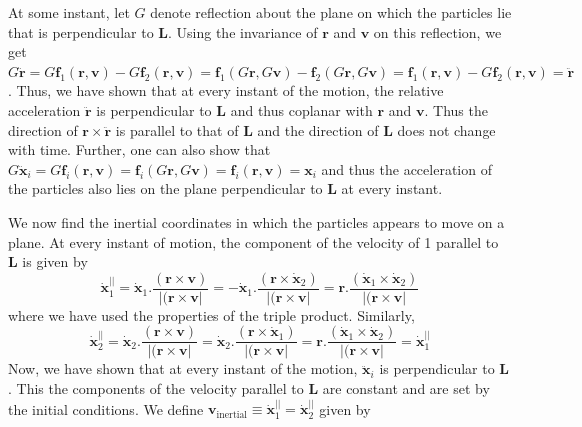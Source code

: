 \begin{enumerate}
At some instant, let $ G $ denote reflection about the plane on which the particles lie that is perpendicular to $\mathbf{L}$. Using the invariance of $\mathbf{r}$ and $\mathbf{v}$ on this reflection, we get $G \ddot{\mathbf{r}} = G\mathbf{f}_1(\mathbf{r},\mathbf{v})-G\mathbf{f}_2(\mathbf{r},\mathbf{v}) =\mathbf{f}_1(G\mathbf{r},G\mathbf{v})-\mathbf{f}_2(G\mathbf{r},G\mathbf{v}) = \mathbf{f}_1(\mathbf{r},\mathbf{v})-G\mathbf{f}_2(\mathbf{r},\mathbf{v}) = \ddot{\mathbf{r}} $. Thus, we have shown that at every instant of the motion, the relative acceleration $\ddot{\mathbf{r}}$ is perpendicular to $\mathbf{L}$ and thus coplanar with $\mathbf{r}$ and $\mathbf{v}$. Thus the direction of $\mathbf{r}\times\ddot{\mathbf{r}}$ is parallel to that of $\mathbf{L}$ and the direction of $\mathbf{L}$ does not change with time. Further, one can also show that $G \ddot{\mathbf{x}}_i =G\mathbf{f}_i(\mathbf{r},\mathbf{v}) = \mathbf{f}_i(G\mathbf{r},G\mathbf{v}) = \mathbf{f}_i(\mathbf{r},\mathbf{v}) = \mathbf{x}_i$ and thus the acceleration of the particles also lies on the plane perpendicular to $\mathbf{L}$ at every instant.\par
We now find the inertial coordinates in which the particles appears to move on a plane. At every instant of motion, the component of the velocity of 1 parallel to $\mathbf{L}$ is given by 
\begin{equation}\label{key}
	\dot{\mathbf{x}}_1^{||} = \dot{\mathbf{x}}_1.\frac{(\mathbf{r}\times\mathbf{v})}{|(\mathbf{r}\times\mathbf{v}|} = -\dot{\mathbf{x}}_1.\frac{(\mathbf{r}\times\dot{\mathbf{x}}_2)}{|(\mathbf{r}\times\mathbf{v}|} = \mathbf{r}.\frac{(\dot{\mathbf{x}}_1\times\dot{\mathbf{x}}_2)}{|(\mathbf{r}\times\mathbf{v}|}
\end{equation}
where we have used the properties of the triple product. Similarly,
\begin{equation}\label{key}
	\dot{\mathbf{x}}_2^{||} = \dot{\mathbf{x}}_2.\frac{(\mathbf{r}\times\mathbf{v})}{|(\mathbf{r}\times\mathbf{v}|} = \dot{\mathbf{x}}_2.\frac{(\mathbf{r}\times\dot{\mathbf{x}}_1)}{|(\mathbf{r}\times\mathbf{v}|} = \mathbf{r}.\frac{(\dot{\mathbf{x}}_1\times\dot{\mathbf{x}}_2)}{|(\mathbf{r}\times\mathbf{v}|} = \dot{\mathbf{x}}_1^{||}
\end{equation}
Now, we have shown that at every instant of the motion, $\ddot{\mathbf{x}}_i$ is perpendicular to $\mathbf{L}$. This the components of the velocity parallel to $\mathbf{L}$ are constant and are set by the initial conditions. We define $\mathbf{v}_\mathrm{inertial} \equiv \dot{\mathbf{x}}_1^{||} = \dot{\mathbf{x}}_2^{||}$ given by \begin{equation}\label{key}

\end{equation}
\end{enumerate}
